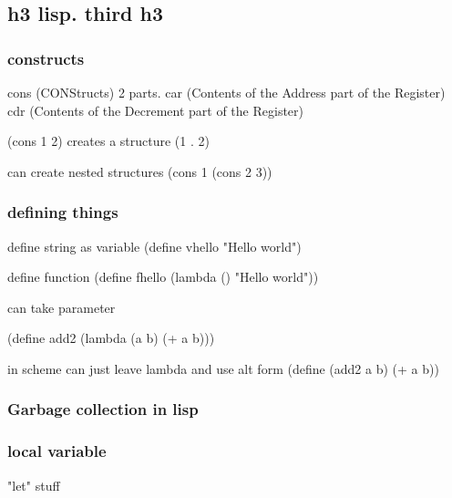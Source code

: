 \subsection{h3 lisp. third h3}
\subsubsection{constructs}
cons (CONStructs)
2 parts. car (Contents of the Address part of the Register)
cdr (Contents of the Decrement part of the Register)

(cons 1 2) creates a structure
(1 . 2)

can create nested structures
(cons 1 (cons 2 3))
\subsubsection{defining things}

define string as variable
(define vhello "Hello world")

define function
(define fhello (lambda () "Hello world"))

can take parameter

(define add2 (lambda (a b) (+ a b)))

in scheme can just leave lambda and use alt form
(define (add2 a b) (+ a b))
\subsubsection{Garbage collection in lisp}
\subsubsection{local variable}
"let" stuff

